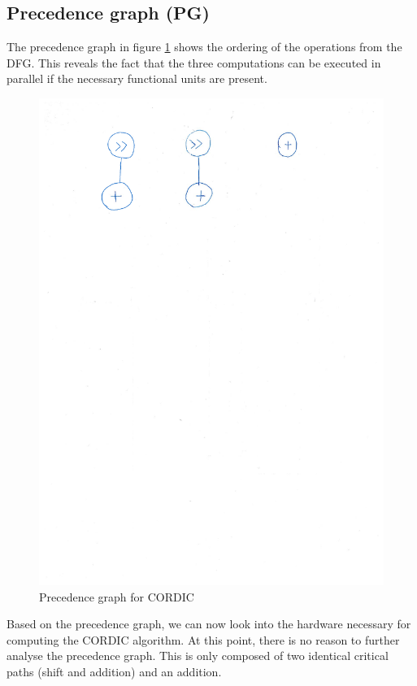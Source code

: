 \documentclass[12pt, a4paper,oneside]{article}
\begin{document}
\subsection{Precedence graph (PG)}
The precedence graph in figure \ref{fig:cordic_pg} shows the ordering of the operations
from the DFG. This reveals the fact that the three computations can be executed 
in parallel if the necessary functional units are present.

\begin{figure}[H]
	\centering
	\includegraphics[width = \linewidth,trim=0 22.9cm 0 2cm, clip]{sequencediagram.pdf}
	\caption{Precedence graph for CORDIC}
	\label{fig:cordic_pg}
\end{figure}

Based on the precedence graph, we can now look into the hardware necessary for
computing the CORDIC algorithm. At this point, there is no reason to further
analyse the precedence graph. This is only composed of two identical 
critical paths (shift and addition) and an addition.
\end{document}

